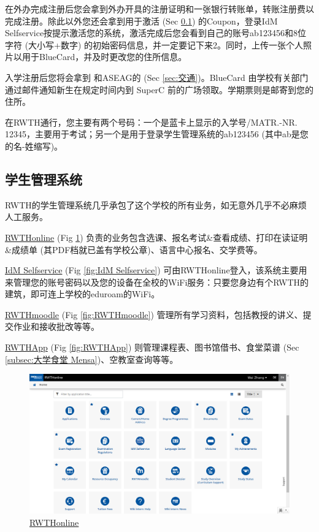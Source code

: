     在外办完成注册后您会拿到外办开具的注册证明和一张银行转账单，转账注册费以完成注册。除此以外您还会拿到用于激活 (Sec \ref{subsec:学生管理系统}) 的Coupon，登录IdM Selfservice按提示激活您的系统，激活完成后您会看到自己的账号ab123456和8位字符 (大小写+数字) 的初始密码信息，并一定要记下来2。同时，上传一张个人照片以用于BlueCard，并及时更改您的住所信息。

    入学注册后您将会拿到 和ASEAG的 (Sec \ref{sec:交通})。BlueCard 由学校有关部门通过邮件通知新生在规定时间内到 SuperC 前的广场领取。学期票则是邮寄到您的住所。

    在RWTH通行，您主要有两个号码：一个是蓝卡上显示的入学号/MATR.-NR. 12345，主要用于考试；另一个是用于登录学生管理系统的ab123456 (其中ab是您的名-姓缩写)。

  \subsection{学生管理系统}\label{subsec:学生管理系统}

    RWTH的学生管理系统几乎承包了这个学校的所有业务，如无意外几乎不必麻烦人工服务。

    \href{https://online.rwth-aachen.de/}{RWTHonline} (Fig \ref{fig:RWTHonline}) 负责的业务包含选课、报名考试\&查看成绩、打印在读证明\&成绩单 (其PDF档就已盖有学校公章)、语言中心报名、交学费等。

    \href{https://idm.rwth-aachen.de/selfservice}{IdM Selfservice} (Fig \ref{fig:IdM Selfservice}) 可由RWTHonline登入，该系统主要用来管理您的账号密码以及您的设备在全校的WiFi服务：只要您身边有个RWTH的建筑，即可连上学校的eduroam的WiFi。

    \href{https://moodle.rwth-aachen.de/}{RWTHmoodle} (Fig \ref{fig:RWTHmoodle}) 管理所有学习资料，包括教授的讲义、提交作业和接收批改等等。

    \href{https://play.google.com/store/apps/details?id=de.rwth_aachen.rz.rwthapp&hl=en}{RWTHApp} (Fig \ref{fig:RWTHApp}) 则管理课程表、图书馆借书、食堂菜谱 (Sec \ref{subsec:大学食堂 Mensa})、空教室查询等等。

    \begin{figure}[H]
      \centering
      \includegraphics[width=\textwidth]{初来乍到/Management_System/RWTHonline.png}
      \caption{\href{https://online.rwth-aachen.de/}{RWTHonline}}
      \label{fig:RWTHonline}
    \end{figure}

